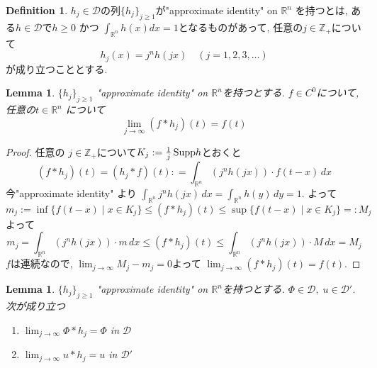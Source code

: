 \documentclass[dvipdfmx,a4paper,11pt]{article} %
\newtheorem{lem}[thm]{Lemma}
\theoremstyle{definition}
\newtheorem{defn}[thm]{Definition}
\theoremstyle{remark}
\numberwithin{equation}{section}
\newcommand{\Supp}{{\rm Supp}}
\newcommand{\R}{\mathbb{R}}
\newcommand{\N}{\mathbb{Z}_+}
\begin{document}
\begin{tcolorbox}[mybox]
\begin{defn}\cite[Definition 6.31]{Rud}
\label{defn-H-2.11}
$h_j \in \mathcal{D}$の列\(\{ h_j \}_{j \geq 1}\)が"approximate identity" on \(\mathbb{R}^n\) を持つとは, ある\(h \in \mathcal{D}\)で\(h \geq 0\) かつ \(\int_{\mathbb{R}^n} h(x) dx = 1\)となるものがあって, 任意の$j \in \N$について
\[
h_j(x) = j^n h(jx) \quad (j=1,2,3,\ldots)
\]
が成り立つこととする. 
\end{defn}
\end{tcolorbox}
\begin{tcolorbox}[mybox]
\begin{lem}%
\label{lem-H-2.12}
\(\{h_j\}_{j \ge 1}\) "approximate identity" on \(\mathbb{R}^n\)を持つとする.  
\(f \in C^0\)について, 任意の$t  \in \R^n$ について
 $$
 \lim_{j \to \infty} (f * h_j)(t) = f(t)
 $$
\end{lem}
\end{tcolorbox}
\begin{proof}
任意の \( j \in \N\)について\(K_j := \tfrac{1}{j} \, \Supp h\)とおくと
\[
(f \ast h_j)(t) = (h_j \ast f)(t) :
= \int_{\R^n} (j^n h(jx)) \cdot f(t-x)\, dx
\]
今"approximate identity" より
\(\int_{\R^n} j^n h(jx)\, dx = \int_{\R^n} h(y)\, dy = 1.\) よって
\[
m_j :=\inf \{ f(t-x) \mid x \in K_j \} \le (f \ast h_j)(t) \le \sup \{ f(t-x) \mid x \in K_j \}=:M_j
\]
よって
$$
m_j=
\int_{\R^n} (j^n h(jx))\cdot m \, dx
\le (f \ast h_j)(t) \le 
\int_{\R^n} (j^n h(jx))\cdot M \, dx
=M_j
$$
$f$は連続なので, $\lim_{j \to \infty}M_j-m_j =0$よって
\(\lim_{j \to \infty} (f \ast h_j)(t) = f(t).\)
\end{proof}

\begin{tcolorbox}[mybox]
\begin{lem}\cite[Theorem 6.32]{Rud}
\label{lem-H-2.13}
\(\{h_j\}_{j \ge 1}\) "approximate identity" on \(\mathbb{R}^n\)を持つとする.  
\(\Phi \in \mathcal{D}, \; u \in \mathcal{D}'\). \\

次が成り立つ
\begin{enumerate}[label=$(\alph*)$]
\item  \(\lim_{j \to \infty} \Phi * h_j = \Phi \) in \( \mathcal{D} \)
\item \(\lim_{j \to \infty} u * h_j = u\) in \( \mathcal{D}'\)
\end{enumerate}
\end{lem}
\end{tcolorbox}
\end{document}
